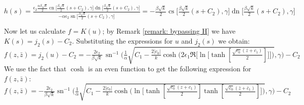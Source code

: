 \documentclass[12pt]{article}
\theoremstyle{plain}
\theoremstyle{definition}
\theoremstyle{remark}
\begin{document}
\noindent
 \footnotesize\(
   h(s)=\tfrac{\epsilon_2\tfrac{\alpha\beta\sqrt k}{2}\operatorname{cn}\big[\tfrac{\beta\sqrt k}{2}(s+C_2),\gamma\big]\operatorname{dn}\big[\tfrac{\beta\sqrt k}{2}(s+C_2),\gamma\big]}{-\alpha\epsilon_2\operatorname{sn}\big[\tfrac{\beta\sqrt k}{2}(s+C_2),\gamma\big]}=-\tfrac{\beta\sqrt k}{2}\operatorname{cs}\big[\tfrac{\beta\sqrt k}{2}(s+C_2),\gamma\big]\operatorname{dn}\big[\tfrac{\beta\sqrt k}{2}(s+C_2),\gamma\big]
 \)\normalsize  
 
  Now let us calculate \(f=K(u)\); by Remark \ref{remark: bypassing H} we have \(K(s)=j_2(s)-C_2\). Substituting the expressions for \(u\) and \(j_2(s)\) we obtain:
  \footnotesize\[
    f(z,\bar z)=j_2(u)-C_2=-\tfrac{2\epsilon_2}{\beta\sqrt k}\,\operatorname{sn}^{-1} \Big(\tfrac{1}{\alpha}\sqrt{C_1 - \tfrac{2|c_0|}{k}\cosh\big(2\epsilon_1\Re\big[\ln\big[\tanh[\tfrac{\sqrt{c_0}(z + c_1)}{2}]\big]\big]\big)},\gamma\Big)-C_2
  \]\normalsize
  We use the fact that \(\cosh\) is an even function to get the following expression for \(f(z,\bar z)\): \footnotesize\(f(z, \bar z)=-\tfrac{2\epsilon_2}{\beta\sqrt k}\operatorname{sn}^{-1}\Big(\tfrac{1}{\alpha}\sqrt{C_1 - \tfrac{2|c_0|}{k}\cosh\big(\ln\big[\tanh[\tfrac{\sqrt{c_0}(z + c_1)}{2}]\tanh[\tfrac{\sqrt{\bar c_0}(\bar z + \bar c_1)}{2}]\big]\big)},\gamma\Big)-C_2\)\normalsize
  
\end{document}
